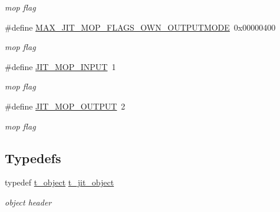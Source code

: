 \begin{DoxyCompactItemize}
\begin{DoxyCompactList}\small\item\em mop flag \item\end{DoxyCompactList}\item 
\hypertarget{group__jitter_gadad1691bc68342a60441cb884a89129d}{
\#define \hyperlink{group__jitter_gadad1691bc68342a60441cb884a89129d}{MAX\_\-JIT\_\-MOP\_\-FLAGS\_\-OWN\_\-OUTPUTMODE}~0x00000400}
\label{group__jitter_gadad1691bc68342a60441cb884a89129d}

\begin{DoxyCompactList}\small\item\em mop flag \item\end{DoxyCompactList}\item 
\hypertarget{group__jitter_gaabaf165bab15a39bbd561807b3f5bb37}{
\#define \hyperlink{group__jitter_gaabaf165bab15a39bbd561807b3f5bb37}{JIT\_\-MOP\_\-INPUT}~1}
\label{group__jitter_gaabaf165bab15a39bbd561807b3f5bb37}

\begin{DoxyCompactList}\small\item\em mop flag \item\end{DoxyCompactList}\item 
\hypertarget{group__jitter_ga979fc199dadb0724f942c6a48cb733a1}{
\#define \hyperlink{group__jitter_ga979fc199dadb0724f942c6a48cb733a1}{JIT\_\-MOP\_\-OUTPUT}~2}
\label{group__jitter_ga979fc199dadb0724f942c6a48cb733a1}

\begin{DoxyCompactList}\small\item\em mop flag \item\end{DoxyCompactList}\end{DoxyCompactItemize}
\subsection*{Typedefs}
\begin{DoxyCompactItemize}
\item 
\hypertarget{group__jitter_ga0eb2cd9c8e3b9803ba31069575a1ffb9}{
typedef \hyperlink{structt__object}{t\_\-object} \hyperlink{group__jitter_ga0eb2cd9c8e3b9803ba31069575a1ffb9}{t\_\-jit\_\-object}}
\label{group__jitter_ga0eb2cd9c8e3b9803ba31069575a1ffb9}

\begin{DoxyCompactList}\small\item\em object header \item\end{DoxyCompactList}\end{DoxyCompactItemize}
